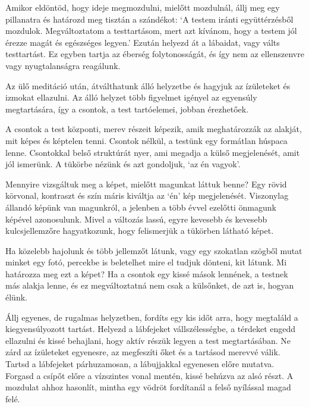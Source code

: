Amikor eldöntöd, hogy ideje megmozdulni, mielőtt mozdulnál, állj meg egy
pillanatra és határozd meg tisztán a szándékot: `A testem iránti
együttérzésből mozdulok. Megváltoztatom a testtartásom, mert azt
kívánom, hogy a testem jól érezze magát és egészséges legyen.' Ezután
helyezd át a lábaidat, vagy válts testtartást. Ez egyben tartja az
éberség folytonosságát, és így nem az ellenszenvre vagy nyugtalanságra
reagálunk.


Az ülő meditáció után, átválthatunk álló helyzetbe és hagyjuk az
ízületeket és izmokat ellazulni. Az álló helyzet több figyelmet igényel
az egyensúly megtartására, így a csontok, a test tartóelemei, jobban
érezhetőek.

A csontok a test központi, merev részeit képezik, amik meghatározzák az
alakját, mit képes és képtelen tenni. Csontok nélkül, a testünk egy
formátlan húspaca lenne. Csontokkal belső struktúrát nyer, ami megadja a
külső megjelenését, amit jól ismerünk. A tükörbe nézünk és azt
gondoljuk, `az én vagyok'.

\enlargethispage*{\baselineskip}

Mennyire vizsgáltuk meg a képet, mielőtt magunkat láttuk benne? Egy
rövid körvonal, kontraszt és szín máris kiváltja az `én' kép
megjelenését. Viszonylag állandó képünk van magunkról, a jelenben a több
évvel ezelőtti önmagunk képével azonosulunk. Mivel a változás lassú,
egyre kevesebb és kevesebb kulcsjellemzőre hagyatkozunk, hogy
felismerjük a tükörben látható képet.

Ha közelebb hajolunk és több jellemzőt látunk, vagy egy szokatlan
szögből mutat minket egy fotó, percekbe is beletelhet mire el tudjuk
dönteni, kit látunk. Mi határozza meg ezt a képet? Ha a csontok egy kissé
mások lennének, a testnek más alakja lenne, és ez megváltoztatná nem
csak a külsőnket, de azt is, hogyan élünk.


Állj egyenes, de rugalmas helyzetben, fordíts egy kis időt arra, hogy
megtaláld a kiegyensúlyozott tartást. Helyezd a lábfejeket
vállszélességbe, a térdeket engedd ellazulni és kissé behajlani, hogy
aktív részük legyen a test megtartásában. Ne zárd az ízületeket
egyenesre, az megfeszíti őket és a tartásod merevvé válik. Tartsd a
lábfejeket párhuzamosan, a lábujjakkal egyenesen előre mutatva. Forgasd
a csípőt előre a vízszintes vonal mentén, kissé behúzva az alsó részt. A
mozdulat ahhoz hasonlít, mintha egy vödröt fordítanál a felső nyílással
magad felé.

